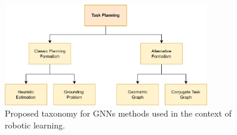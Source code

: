 \begin{figure}[t]
    \centering
    \includegraphics[width=0.8\textwidth]{figures/images/ch4/gnn_taxonomy.jpg}
    \caption{Proposed taxonomy for GNNs methods used in the context of robotic learning.}
    \label{fig:gnn_taxonomy}
\end{figure}
